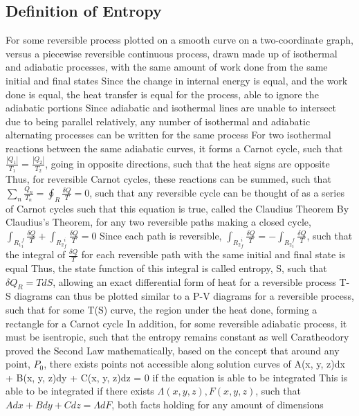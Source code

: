 \documentclass[11 pt, twoside]{article}
\newenvironment{outline*}
{
	\begin{outline}[enumerate]
	}
	{\end{outline}
}
\begin{document}
\subsection{Definition of Entropy}
\begin{outline*}
\1 For some reversible process plotted on a smooth curve on a two-coordinate graph, versus a piecewise reversible continuous process, drawn made up of isothermal and adiabatic processes, with the same amount of work done from the same initial and final states
\2 Since the change in internal energy is equal, and the work done is equal, the heat transfer is equal for the process, able to ignore the adiabatic portions
\2 Since adiabatic and isothermal lines are unable to intersect due to being parallel relatively, any number of isothermal and adiabatic alternating processes can be written for the same process
\2 For two isothermal reactions between the same adiabatic curves, it forms a Carnot cycle, such that $\frac{|Q_1|}{T_1} = \frac{|Q_2|}{T_2}$, going in opposite directions, such that the heat signs are opposite
\3 Thus, for reversible Carnot cycles, these reactions can be summed, such that $\sum_n \frac{Q_n}{T_n} = \oint_R \frac{\delta Q}{T} = 0$, such that any reversible cycle can be thought of as a series of Carnot cycles such that this equation is true, called the Claudius Theorem
\1 By Claudius's Theorem, for any two reversible paths making a closed cycle, $\int_{R_1}_i^f \frac{\delta Q}{T} + \int_{R_2}_f^i \frac{\delta Q}{T} = 0$
\2 Since each path is reversible, $\int_{R_2}_f^i \frac{\delta Q}{T} = -\int_{R_2}_i^f \frac{\delta Q}{T}$, such that the integral of $\frac{\delta Q}{T}$ for each reversible path with the same initial and final state is equal
\2 Thus, the state function of this integral is called entropy, S, such that $\delta Q_R = TdS$, allowing an exact differential form of heat for a reversible process
\3 T-S diagrams can thus be plotted similar to a P-V diagrams for a reversible process, such that for some T(S) curve, the region under the heat done, forming a rectangle for a Carnot cycle
\3 In addition, for some reversible adiabatic process, it must be isentropic, such that the entropy remains constant as well
\1 Caratheodory proved the Second Law mathematically, based on the concept that around any point, $P_0$, there exists points not accessible along solution curves of A(x, y, z)dx + B(x, y, z)dy + C(x, y, z)dz = 0 if the equation is able to be integrated
\2 This is able to be integrated if there exists $\Lambda(x, y, z), F(x, y, z)$, such that $Adx + Bdy + Cdz = \Lambda dF$, both facts holding for any amount of dimensions

\end{outline*}
\end{document}
